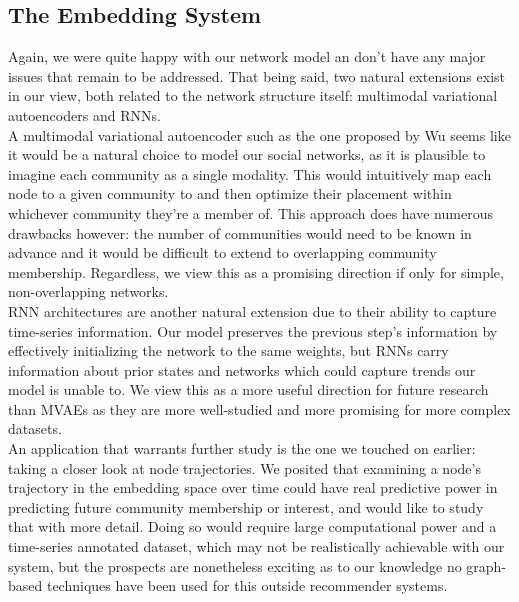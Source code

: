 \documentclass[12pt,twoside]{report}
\begin{document}
\subsection{The Embedding System}

Again, we were quite happy with our network model an don't have any major issues that remain to be addressed. That being said, two natural extensions exist in our view, both related to the network structure itself: multimodal variational autoencoders and RNNs. \\

A multimodal variational autoencoder such as the one proposed by Wu \cite{wu2018multimodal} seems like it would be a natural choice to model our social networks, as it is plausible to imagine each community as a single modality. This would intuitively map each node to a given community to and then optimize their placement within whichever community they're a member of. This approach does have numerous drawbacks however: the number of communities would need to be known in advance and it would be difficult to extend to overlapping community membership. Regardless, we view this as a promising direction if only for simple, non-overlapping networks. \\

RNN architectures are another natural extension due to their ability to capture time-series information. Our model preserves the previous step's information by effectively initializing the network to the same weights, but RNNs carry information about prior states and networks which could capture trends our model is unable to. We view this as a more useful direction for future research than MVAEs as they are more well-studied and more promising for more complex datasets. \\

An application that warrants further study is the one we touched on earlier: taking a closer look at node trajectories. We posited that examining a node's trajectory in the embedding space over time could have real predictive power in predicting future community membership or interest, and would like to study that with more detail. Doing so would require large computational power and a time-series annotated dataset, which may not be realistically achievable with our system, but the prospects are nonetheless exciting as to our knowledge no graph-based techniques have been used for this outside recommender systems. \\



 
\end{document}
